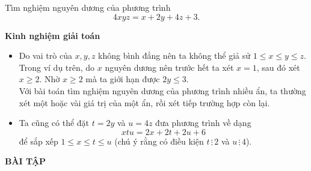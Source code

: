 \begin{vd}
	Tìm nghiệm nguyên dương của phương trình $$4xyz=x+2y+4z+3.$$
\end{vd}
\begin{note}
	\textbf{Kinh nghiệm giải toán}
	\begin{itemize}
		\item Do vai trò của $x,y,z$ không bình đẳng nên ta không thể giả sử $1\leq x \leq y \leq z$. Trong ví dụ trên, do $x$ nguyên dương nên trước hết ta xét $x=1$, sau đó xét $x\geq 2$. Nhờ $x \geq 2$ mà ta giới hạn được $2y \leq 3$.\\
		Với bài toán tìm nghiệm nguyên dương của phương trình nhiều ẩn, ta thường xét một hoặc vài giá trị của một ẩn, rồi xét tiếp trường hợp còn lại.
		\item Ta cũng có thể đặt $t=2y$ và $u=4z$ đưa phương trình về dạng $$xtu=2x+2t+2u+6$$
		để sắp xếp $1 \leq x \leq t \leq u$ (chú ý rằng có điều kiện $t \, \vdots \, 2 $ và $u \, \vdots \, 4$).
	\end{itemize}
\end{note}
\begin{center}
    \textbf{BÀI TẬP}
\end{center}
\setcounter{bt}{69}
